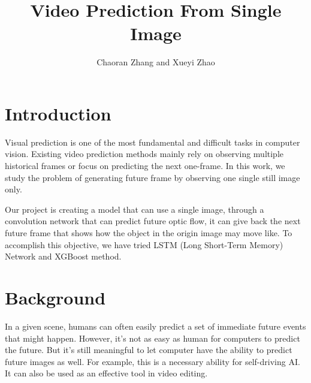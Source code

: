 \documentclass{acmtog} %
\begin{document}

\title{Video Prediction From Single Image} %

\author{Chaoran Zhang {\upshape and} Xueyi Zhao
}


\maketitle


\section{Introduction}

Visual prediction is one of the most fundamental and diﬃcult tasks in computer vision. Existing video prediction methods mainly rely on observing multiple historical frames or focus on predicting the next one-frame. In this work, we study the problem of generating future frame by observing one single still image only. 

Our project is creating a model that can use a single image, through a convolution network that can predict future optic flow, it can give back the next future frame that shows how the object in the origin image may move like. To accomplish this objective, we have tried LSTM (Long Short-Term Memory) Network and XGBoost method. 





\section{Background}

In a given scene, humans can often easily predict a set of immediate future events that might happen. However, it's not as easy as human for computers to predict the future. But it's still meaningful to let computer have the ability to predict future images as well. For example, this is a necessary ability for self-driving AI. It can also be used as an effective tool in video editing.
\end{document}
